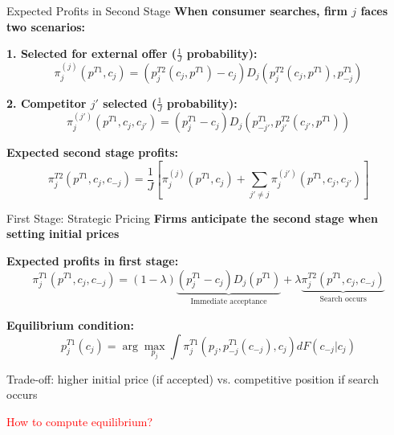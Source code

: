 \documentclass[10pt,aspectratio=169]{beamer}
\begin{document}

\begin{frame}{Expected Profits in Second Stage}
\textbf{When consumer searches, firm $j$ faces two scenarios:}

\vspace{0.3cm}

\textbf{1. Selected for external offer ($\frac{1}{J}$ probability):}
$$\pi^{(j)}_j(p^{T1}, c_j) = (p^{T2}_j(c_j, p^{T1}) - c_j) D_j(p^{T2}_j(c_j, p^{T1}), p^{T1}_{-j})$$

\vspace{0.3cm}

\textbf{2. Competitor $j'$ selected ($\frac{1}{J}$ probability):}
$$\pi^{(j')}_j(p^{T1}, c_j, c_{j'}) = (p^{T1}_j - c_j) D_j(p^{T1}_{-j'}, p^{T2}_{j'}(c_{j'}, p^{T1}))$$

\vspace{0.5cm}

\textbf{Expected second stage profits:}
$$\pi^{T2}_j(p^{T1}, c_j, c_{-j}) = \frac{1}{J}\left[\pi^{(j)}_j(p^{T1}, c_j) + \sum_{j' \neq j} \pi^{(j')}_j(p^{T1}, c_j, c_{j'})\right]$$
\end{frame}


\begin{frame}{First Stage: Strategic Pricing}
\textbf{Firms anticipate the second stage when setting initial prices}

\vspace{0.5cm}

\textbf{Expected profits in first stage:}
$$\pi^{T1}_j(p^{T1}, c_j, c_{-j}) = (1-\lambda)\underbrace{(p^{T1}_j - c_j)D_j(p^{T1})}_{\text{Immediate acceptance}} + \lambda \underbrace{\pi^{T2}_j(p^{T1}, c_j, c_{-j})}_{\text{Search occurs}}$$

\vspace{0.5cm}

\textbf{Equilibrium condition:}
$$p^{T1}_j(c_j) = \arg\max_{p_j} \int \pi^{T1}_j(p_j, p^{T1}_{-j}(c_{-j}), c_j) dF(c_{-j}|c_j)$$

\vspace{0.3cm}
Trade-off: higher initial price (if accepted) vs. competitive position if search occurs

\textcolor{red}{How to compute equilibrium?}
\end{frame}
\end{document}

